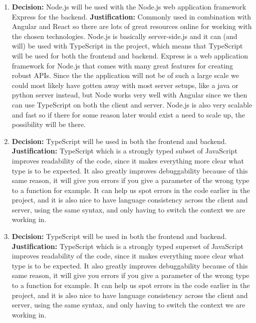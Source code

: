\documentclass{article}
\begin{document}
\begin{enumerate}
    \item \textbf{Decision:} Node.js will be used with the Node.js web application framework Express for the backend.
    \linebreak{}
    \textbf{Justification:} Commonly used in combination with Angular and React so there are lots of great resources online for working with the chosen technologies. Node.js is basically server-side.js and it can (and will) be used with TypeScript in the project, which means that TypeScript will be used for both the frontend and backend. Express is a web application framework for Node.js that comes with many great features for creating robust APIs. Since the the application will not be of such a large scale we could most likely have gotten away with most server setups, like a java or python server instead, but Node works very well with Angular since we then can use TypeScript on both the client and server. Node.js is also very scalable and fast so if there for some reason later would exist a need to scale up, the possibility will be there. 
    
     \item \textbf{Decision:} TypeScript will be used in both the frontend and backend.
    \linebreak{}
    \textbf{Justification:} TypeScript which is a strongly typed subset of JavaScript improves readability of the code, since it makes everything more clear what type is to be expected. It also greatly improves debuggability because of this same reason, it will give you errors if you give a parameter of the wrong type to a function for example. It can help us spot errors in the code earlier in the project, and it is also nice to have language consistency across the client and server, using the same syntax, and only having to switch the context we are working in. 
    
     \item \textbf{Decision:} TypeScript will be used in both the frontend and backend.
    \linebreak{}
    \textbf{Justification:} TypeScript which is a strongly typed superset of JavaScript improves readability of the code, since it makes everything more clear what type is to be expected. It also greatly improves debuggability because of this same reason, it will give you errors if you give a parameter of the wrong type to a function for example. It can help us spot errors in the code earlier in the project, and it is also nice to have language consistency across the client and server, using the same syntax, and only having to switch the context we are working in. 
    

\end{enumerate}
\end{document}
